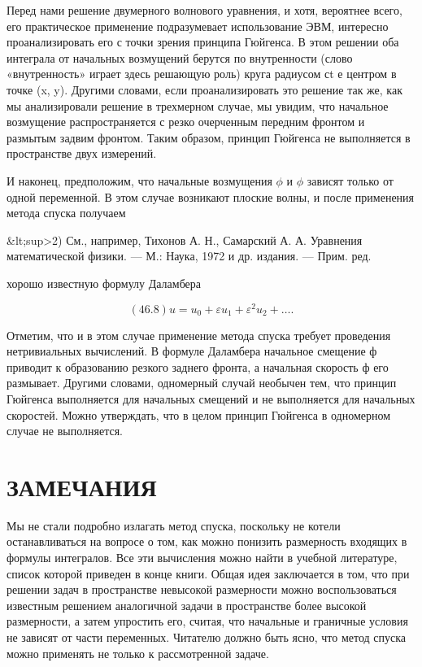 \documentclass[
  ukrainian,
]{article}
\begin{document}
Перед нами решение двумерного волнового уравнения, и хотя, вероятнее
всего, его практическое применение подразумевает использование ЭВМ,
интересно проанализировать его с точки зрения принципа Гюйгенса. В этом
решении оба интеграла от начальных возмущений берутся по внутренности
(слово «внутренность» играет здесь решающую роль) круга радиусом сt е
центром в точке (x, y). Другими словами, если проанализировать это
решение так же, как мы анализировали решение в трехмерном случае, мы
увидим, что начальное возмущение распространяется с резко очерченным
передним фронтом и размытым задвим фронтом. Таким образом, принцип
Гюйгенса не выполняется в пространстве двух измерений.

И наконец, предположим, что начальные возмущения \(\phi\) и \(\phi\)
зависят только от одной переменной. В этом случае возникают плоские
волны, и после применения метода спуска получаем

\&lt;sup\textgreater2) См., например, Тихонов А. Н., Самарский А. А.
Уравнения математической физики. --- М.: Наука, 1972 и др. издания. ---
Прим. ред.

хорошо известную формулу Даламбера

\[
(46.8) u = u_0 + \varepsilon u_1 + \varepsilon^2 u_2 + \dots.
\]

Отметим, что и в этом случае применение метода спуска требует проведения
нетривиальных вычислений. В формуле Даламбера начальное смещение ф
приводит к образованию резкого заднего фронта, а начальная скорость ф
его размывает. Другими словами, одномерный случай необычен тем, что
принцип Гюйгенса выполняется для начальных смещений и не выполняется для
начальных скоростей. Можно утверждать, что в целом принцип Гюйгенса в
одномерном случае не выполняется.

\section{ЗАМЕЧАНИЯ}\label{ux437ux430ux43cux435ux447ux430ux43dux438ux44f-10}

Мы не стали подробно излагать метод спуска, поскольку не котели
останавливаться на вопросе о том, как можно понизить размерность
входящих в формулы интегралов. Все эти вычисления можно найти в учебной
литературе, список которой приведен в конце книги. Общая идея
заключается в том, что при решении задач в пространстве невысокой
размерности можно воспользоваться известным решением аналогичной задачи
в пространстве более высокой размерности, а затем упростить его, считая,
что начальные и граничные условия не зависят от части переменных.
Читателю должно быть ясно, что метод спуска можно применять не только к
рассмотренной задаче.
\end{document}
